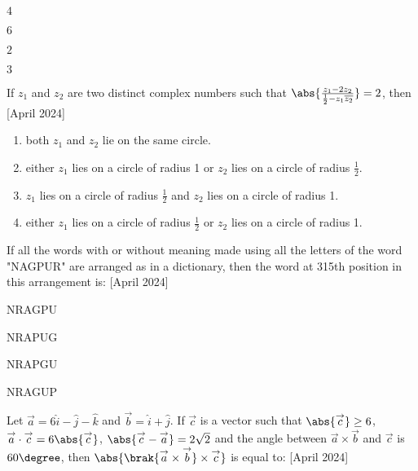 \begin{enumerate}
\begin{multicols}{4}
\item $4$
\item $6$
\item $2$
\item $3$
\end{multicols}
\end{enumerate}
\item If $z_1$ and $z_2$ are two distinct complex numbers such that $\abs{\frac{z_1 -2z_2}{\frac{1}{2}-z_1 \overline{z_2}}} = 2$, then \hfill{[April 2024]}
\begin{enumerate}
\item both $z_1$ and $z_2$ lie on the same circle.
\item either $z_1$ lies on a circle of radius 1 or $z_2$ lies on a circle of radius $\frac{1}{2}$.
\item $z_1$ lies on a circle of radius $\frac{1}{2}$ and $z_2$ lies on a circle of radius 1.
\item either $z_1$ lies on a circle of radius $\frac{1}{2}$ or $z_2$ lies on a circle of radius 1.
\end{enumerate}
\item If all the words with or without meaning made using all the letters of the word "NAGPUR" are arranged as in a dictionary, then the word at 315th position in this arrangement is: \hfill{[April 2024]}
\begin{enumerate}
\begin{multicols}{4}
\item NRAGPU
\item NRAPUG
\item NRAPGU
\item NRAGUP
\end{multicols}
\end{enumerate}
\item Let $\overset{\rightarrow}{a} = 6\hat{i} - \hat{j} - \hat{k}$ and $\overset{\rightarrow}{b} = \hat{i} + \hat{j}$. If $\overset{\rightarrow}{c}$ is a vector such that $\abs{\overset{\rightarrow}{c}} \geq 6$, $\overset{\rightarrow}{a}\cdot \overset{\rightarrow}{c}=6\abs{\overset{\rightarrow}{c}}$, $\abs{\overset{\rightarrow}{c}-\overset{\rightarrow}{a}}=2\sqrt{2}$ and the angle between $\overset{\rightarrow}{a} \times \overset{\rightarrow}{b}$ and $\overset{\rightarrow}{c}$ is $60\degree$, then $\abs{\brak{\overset{\rightarrow}{a} \times \overset{\rightarrow}{b}} \times \overset{\rightarrow}{c}}$ is equal to: \hfill{[April 2024]}

